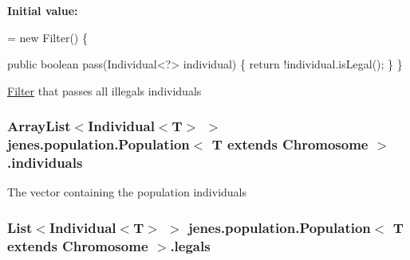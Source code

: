 {\bfseries Initial value\-:}
\begin{DoxyCode}
= \textcolor{keyword}{new} Filter() \{

        \textcolor{keyword}{public} \textcolor{keywordtype}{boolean} pass(Individual<?> individual) \{
            \textcolor{keywordflow}{return} !individual.isLegal();
        \}
    \}
\end{DoxyCode}
\hyperlink{interfacejenes_1_1population_1_1_population_3_01_t_01extends_01_chromosome_01_4_1_1_filter}{Filter} that passes all illegals individuals \hypertarget{classjenes_1_1population_1_1_population_3_01_t_01extends_01_chromosome_01_4_a3e44ded88c30a8dab6b35fadd986ef47}{
\subsubsection[{individuals}]{\setlength{\rightskip}{0pt plus 5cm}Array\-List$<$Individual$<$T$>$ $>$ jenes.\-population.\-Population$<$ T extends Chromosome $>$.individuals\hspace{0.3cm}{\ttfamily [private]}}}\label{classjenes_1_1population_1_1_population_3_01_t_01extends_01_chromosome_01_4_a3e44ded88c30a8dab6b35fadd986ef47}
The vector containing the population individuals \hypertarget{classjenes_1_1population_1_1_population_3_01_t_01extends_01_chromosome_01_4_ac33145aefb6ffe7d446b23deef546adf}{
\subsubsection[{legals}]{\setlength{\rightskip}{0pt plus 5cm}List$<$Individual$<$T$>$ $>$ jenes.\-population.\-Population$<$ T extends Chromosome $>$.legals\hspace{0.3cm}{\ttfamily [private]}}}\label{classjenes_1_1population_1_1_population_3_01_t_01extends_01_chromosome_01_4_ac33145aefb6ffe7d446b23deef546adf}
